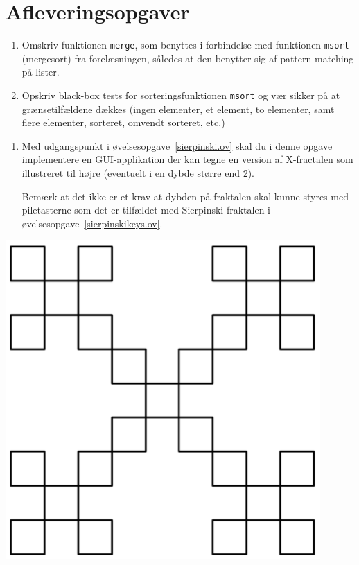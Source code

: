 \documentclass[a4paper,12pt]{article}
\begin{document}
\section*{Afleveringsopgaver}
\begin{enumerate}[label=5i.\arabic*,start=0]
\item Omskriv funktionen \lstinline{merge}, som benyttes i forbindelse
  med funktionen \lstinline{msort} (mergesort) fra forelæsningen,
  således at den benytter sig af pattern matching på lister.
\item Opskriv black-box tests for sorteringsfunktionen \lstinline{msort} og vær
  sikker på at grænsetilfældene dækkes (ingen elementer, et element,
  to elementer, samt flere elementer, sorteret, omvendt sorteret, etc.)
\end{enumerate}

\begin{minipage}{0.7\textwidth}
\begin{enumerate}[label=5i.\arabic*,start=2]
\item Med udgangspunkt i øvelsesopgave~\ref{sierpinski.ov} skal du i
  denne opgave implementere en GUI-applikation der kan tegne en
  version af X-fractalen som illustreret til højre (eventuelt i en
  dybde større end 2).

  Bemærk at det ikke er et krav at dybden på fraktalen skal kunne
  styres med piletasterne som det er tilfældet med
  Sierpinski-fraktalen i øvelsesopgave~\ref{sierpinskikeys.ov}.
\end{enumerate}
\end{minipage}\hspace{8mm} \begin{minipage}{0.25\textwidth}
  \includegraphics[width=0.9\textwidth]{xfractal.png}
\end{minipage}
\end{document}
